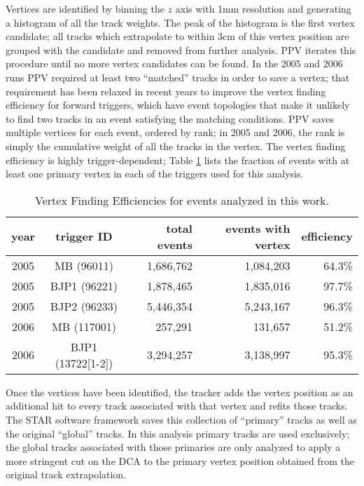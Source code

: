 Vertices are identified by binning the $z$ axis with 1mm resolution and
generating a histogram of all the track weights. The peak of the histogram is
the first vertex candidate; all tracks which extrapolate to within 3cm of this
vertex position are grouped with the candidate and removed from further
analysis. PPV iterates this procedure until no more vertex candidates can be
found. In the 2005 and 2006 runs PPV required at least two ``matched'' tracks
in order to save a vertex; that requirement has been relaxed in recent years
to improve the vertex finding efficiency for forward triggers, which have
event topologies that make it unlikely to find two tracks in an event
satisfying the matching conditions. PPV saves multiple vertices for each
event, ordered by rank; in 2005 and 2006, the rank is simply the cumulative
weight of all the tracks in the vertex. The vertex finding efficiency is
highly trigger-dependent; Table \ref{tbl:vertex-finding-efficiencies} lists
the fraction of events with at least one primary vertex in each of the
triggers used for this analysis.

\begin{table}
  \begin{center}
    \begin{tabular}{cc|rrr}
      \hline
      year & trigger ID & total events & events with vertex & efficiency\\
      \hline
      \hline
      2005 & MB (96011) & 1,686,762 & 1,084,203 & 64.3\%\\
      \hline
      2005 & BJP1 (96221) & 1,878,465 & 1,835,016 & 97.7\%\\
      \hline
      2005 & BJP2 (96233) & 5,446,354 & 5,243,167 & 96.3\%\\
      \hline
      2006 & MB (117001) & 257,291 & 131,657 & 51.2\%\\
      \hline
      2006 & BJP1 (13722[1-2]) & 3,294,257 & 3,138,997 & 95.3\%\\
      \hline
    \end{tabular}
  \end{center}
  \caption{Vertex Finding Efficiencies for events analyzed in this work.}
  \label{tbl:vertex-finding-efficiencies}
\end{table}

Once the vertices have been identified, the tracker adds the vertex position
as an additional hit to every track associated with that vertex and refits
those tracks. The STAR software framework saves this collection of ``primary''
tracks as well as the original ``global'' tracks. In this analysis primary
tracks are used exclusively; the global tracks associated with those primaries
are only analyzed to apply a more stringent cut on the DCA to the primary
vertex position obtained from the original track extrapolation.

